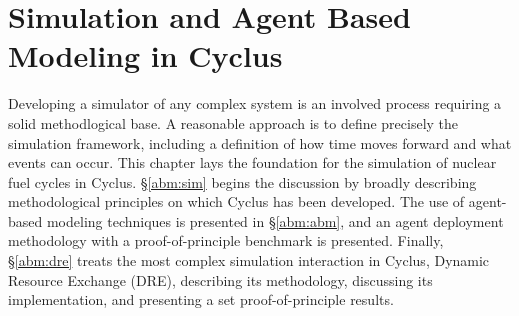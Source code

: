 \chapter{Simulation and Agent Based Modeling in Cyclus}\label{ch:abm}

Developing a simulator of any complex system is an involved process requiring a
solid methodlogical base. A reasonable approach is to define precisely the
simulation framework, including a definition of how time moves forward and what
events can occur. This chapter lays the foundation for the simulation of nuclear
fuel cycles in Cyclus. \S \ref{abm:sim} begins the discussion by broadly
describing methodological principles on which Cyclus has been developed. The use
of agent-based modeling techniques is presented in \S \ref{abm:abm}, and an
agent deployment methodology with a proof-of-principle benchmark is
presented. Finally, \S \ref{abm:dre} treats the most complex simulation
interaction in Cyclus, Dynamic Resource Exchange (DRE), describing its
methodology, discussing its implementation, and presenting a set
proof-of-principle results.






